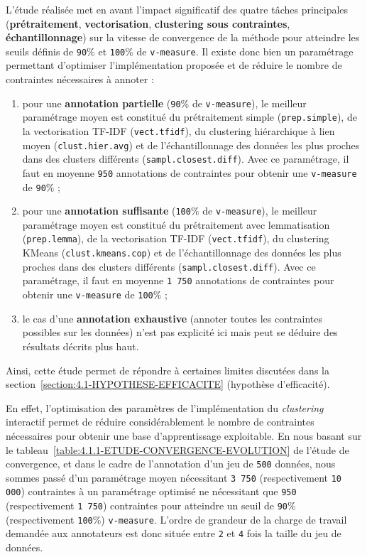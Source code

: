 			L'étude réalisée met en avant l'impact significatif des quatre tâches principales (\textbf{prétraitement}, \textbf{vectorisation}, \textbf{clustering sous contraintes}, \textbf{échantillonnage}) sur la vitesse de convergence de la méthode pour atteindre les seuils définis de \texttt{90}\% et \texttt{100}\% de \texttt{v-measure}. Il existe donc bien un paramétrage permettant d'optimiser l'implémentation proposée et de réduire le nombre de contraintes nécessaires à annoter :
			\begin{enumerate}
				\item pour une \textbf{annotation partielle} (\texttt{90}\% de \texttt{v-measure}), le meilleur paramétrage moyen est constitué du prétraitement simple (\texttt{prep.simple}), de la vectorisation TF-IDF (\texttt{vect.tfidf}), du clustering hiérarchique à lien moyen (\texttt{clust.hier.avg}) et de l'échantillonnage des données les plus proches dans des clusters différents (\texttt{sampl.closest.diff}). Avec ce paramétrage, il faut en moyenne \texttt{950} annotations de contraintes pour obtenir une \texttt{v-measure} de \texttt{90}\% ;
				\item pour une \textbf{annotation suffisante} (\texttt{100}\% de \texttt{v-measure}), le meilleur paramétrage moyen est constitué du prétraitement avec lemmatisation (\texttt{prep.lemma}), de la vectorisation TF-IDF (\texttt{vect.tfidf}), du clustering KMeans (\texttt{clust.kmeans.cop}) et de l'échantillonnage des données les plus proches dans des clusters différents (\texttt{sampl.closest.diff}). Avec ce paramétrage, il faut en moyenne \texttt{1 750} annotations de contraintes pour obtenir une \texttt{v-measure} de \texttt{100}\% ;
				\item le cas d'une \textbf{annotation exhaustive} (annoter toutes les contraintes possibles sur les données) n'est pas explicité ici mais peut se déduire des résultats décrits plus haut.
			\end{enumerate}


			Ainsi, cette étude permet de répondre à certaines limites discutées dans la section~\ref{section:4.1-HYPOTHESE-EFFICACITE} (hypothèse d'efficacité). 
			
			En effet, l'optimisation des paramètres de l'implémentation du \textit{clustering} interactif permet de réduire considérablement le nombre de contraintes nécessaires pour obtenir une base d'apprentissage exploitable.
			En nous basant sur le tableau~\ref{table:4.1.1-ETUDE-CONVERGENCE-EVOLUTION} de l'étude de convergence, et dans le cadre de l'annotation d'un jeu de \texttt{500} données, nous sommes passé d'un paramétrage moyen nécessitant \texttt{3 750} (respectivement \texttt{10 000}) contraintes à un paramétrage optimisé ne nécessitant que \texttt{950} (respectivement \texttt{1 750}) contraintes pour atteindre un seuil de \texttt{90}\% (respectivement \texttt{100}\%) \texttt{v-measure}.
			L'ordre de grandeur de la charge de travail demandée aux annotateurs est donc située entre \texttt{2} et \texttt{4} fois la taille du jeu de données.
			
